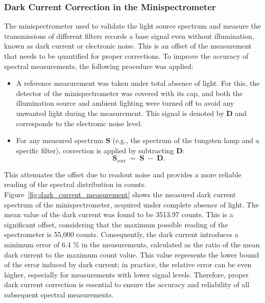 \subsubsection{Dark Current Correction in the Minispectrometer}
\label{subsub:corriente_oscura_espectrometro}

The minispectrometer used to validate the light source spectrum and measure the transmissions of different filters records a base signal even without illumination, known as dark current or electronic noise. This is an offset of the measurement that needs to be quantified for proper corrections. To improve the accuracy of spectral measurements, the following procedure was applied:\\

\begin{itemize}
    \item A reference measurement was taken under total absence of light. For this, the detector of the minispectrometer was covered with its cap, and both the illumination source and ambient lighting were turned off to avoid any unwanted light during the measurement. This signal is denoted by \(\mathbf{D}\) and corresponds to the electronic noise level.
    
    \item For any measured spectrum \(\mathbf{S}\) (e.g., the spectrum of the tungsten lamp and a specific filter), correction is applied by subtracting \(\mathbf{D}\):
    \begin{equation}    
        \mathbf{S}_{\text{corr}} \;=\; \mathbf{S} \;-\; \mathbf{D}.
    \end{equation}
    
\end{itemize}

\noindent This attenuates the offset due to readout noise and provides a more reliable reading of the spectral distribution in counts. Figure~\ref{fig:dark_current_measurement} shows the measured dark current spectrum of the minispectrometer, acquired under complete absence of light. The mean value of the dark current was found to be 3513.97 counts. This is a significant offset, considering that the maximum possible reading of the spectrometer is 55,000 counts. Consequently, the dark current introduces a minimum error of 6.4 \% in the measurements, calculated as the ratio of the mean dark current to the maximum count value. This value represents the lower bound of the error induced by dark current; in practice, the relative error can be even higher, especially for measurements with lower signal levels. Therefore, proper dark current correction is essential to ensure the accuracy and reliability of all subsequent spectral measurements.

